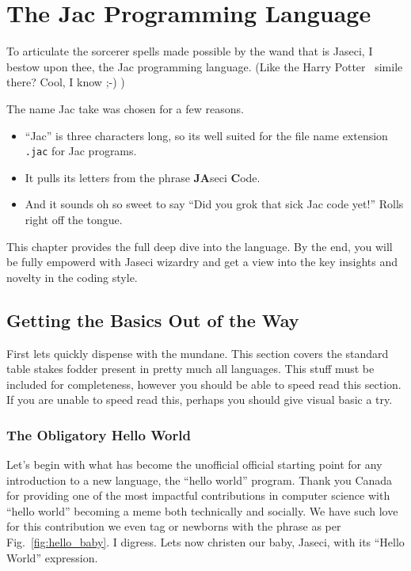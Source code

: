 \chapter{The Jac Programming Language}

To articulate the sorcerer spells made possible by the wand that is Jaseci, I bestow upon thee, the Jac programming language. (Like the Harry Potter~\cite{harrypotter} simile there? Cool, I know ;-) )
\par
The name Jac take was chosen for a few reasons.
\begin{itemize}
    \item ``Jac'' is three characters long, so its well suited for the file name extension \texttt{.jac} for Jac programs.
    \item It pulls its letters from the phrase \textbf{JA}seci \textbf{C}ode.
    \item And it sounds oh so sweet to say ``Did you \gls{grok} that \gls{sick} Jac code yet!'' Rolls right off the tongue.
\end{itemize}
\par
This chapter provides the full deep dive into the language. By the end, you will be fully empowerd with Jaseci wizardry and get a view into the key insights and novelty in the coding style.

\section{Getting the Basics Out of the Way}
First lets quickly dispense with the mundane. This section covers the standard table stakes fodder present in pretty much all languages. This stuff must be included for completeness, however you should be able to speed read this section.  If you are unable to speed read this, perhaps you should give visual basic a try.

\subsection{The Obligatory Hello World}
\printfigHelloWorldBaby
Let's begin with what has become the unofficial official starting point for any introduction to a new language, the ``hello world'' program. Thank you Canada for providing one of the most impactful contributions in computer science with ``hello world'' becoming a meme both technically and socially. We have such love for this contribution we even tag or newborns with the phrase as per Fig.~\ref{fig:hello_baby}. I digress. Lets now \gls{christen} our baby, Jaseci, with its ``Hello World'' expression.

